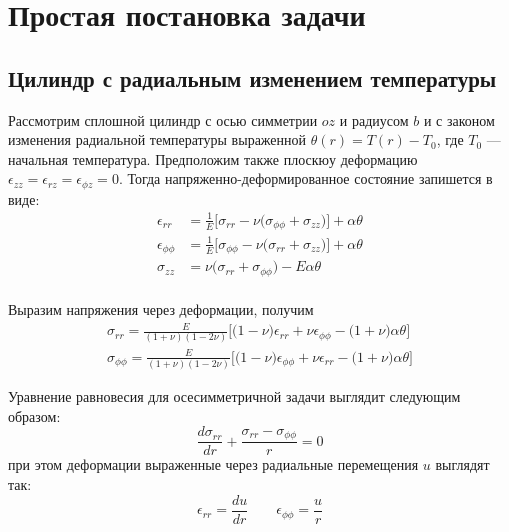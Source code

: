 \chapter{Простая постановка задачи}\label{ch:ch1}

\section{Цилиндр с радиальным изменением температуры}\label{sec:ch1/sec1}

Рассмотрим сплошной цилиндр с осью симметрии \(oz\) и радиусом \(b\) и с законом изменения радиальной температуры выраженной \(\theta(r)=T(r)-T_0\), где \(T_0\) --- начальная температура. Предположим также плоскюу деформацию \(\epsilon_{zz}=\epsilon_{rz}=\epsilon_{\phi z}=0\). Тогда напряженно-деформированное состояние запишется в виде:
\begin{equation}
	\label{eq:ch1:equation1}
\begin{split}
	\epsilon_{rr} &= \frac{1}{E} \big [\sigma_{rr} - \nu \big(\sigma_{\phi\phi} + \sigma_{zz}\big) \big] + \alpha \theta \\
	\epsilon_{\phi\phi} &= \frac{1}{E} \big [\sigma_{\phi\phi} - \nu \big(\sigma_{rr} + \sigma_{zz}\big) \big] + \alpha \theta \\
	\sigma_{zz} &= \nu \big(\sigma_{rr} + \sigma_{\phi\phi}\big) - E\alpha\theta \\
\end{split}
\end{equation}	

Выразим напряжения через деформации, получим
\begin{equation}
	\label{eq:ch1:equation2}
	\begin{split}
		\sigma_{rr} = \frac{E}{(1+\nu)(1-2\nu)} \big[\big(1-\nu \big)\epsilon_{rr} + \nu\epsilon_{\phi\phi} - \big(1+\nu\big )\alpha\theta\big] \\
		\sigma_{\phi\phi} = \frac{E}{(1+\nu)(1-2\nu)} \big[\big(1-\nu \big)\epsilon_{\phi\phi} + \nu\epsilon_{rr} - \big(1+\nu\big )\alpha\theta\big] 
	\end{split}
\end{equation}

Уравнение равновесия для осесимметричной задачи выглядит следующим образом:
\begin{equation}
	\label{eq:ch1:equation3}
		\frac {d\sigma_{rr} }{dr} + \frac {\sigma_{rr}-\sigma_{\phi\phi}}{r}=0
\end{equation}
при этом деформации выраженные через радиальные перемещения \(u\) выглядят так:
\begin{equation}
	\label{eq:ch1:equation4}
	\epsilon_{rr} = \frac{du}{dr} \qquad \epsilon_{\phi\phi} = \frac{u}{r}
\end{equation}

